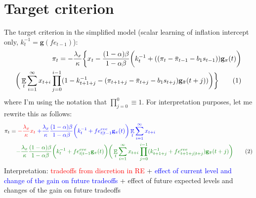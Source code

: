 \documentclass[11pt]{article}
\renewcommand{\[}{\begin{equation}}
\renewcommand{\]}{\end{equation}}
\DeclareMathOperator{\E}{\mathbb{E}}
\newcommand\numberthis{\addtocounter{equation}{1}\tag{\theequation}} %
\begin{document}
\section{Target criterion}\label{target_crit_levels}
The target criterion in the simplified model (scalar learning of inflation intercept only, $k_t^{-1} = \mathbf{g}(fe_{t-1})$):
\begin{align*}
\pi_t  = -\frac{\lambda_x}{\kappa}\bigg\{x_t - \frac{(1-\alpha)\beta}{1-\alpha\beta} \bigg(k_t^{-1}+((\pi_t - \bar{\pi}_{t-1}-b_1 s_{t-1}))\mathbf{g}_{\pi}(t) \bigg) \\
\bigg(\E_t\sum_{i=1}^{\infty}x_{t+i}\prod_{j=0}^{i-1}(1-k_{t+1+j}^{-1} - (\pi_{t+1+j} - \bar{\pi}_{t+j}-b_1 s_{t+j})\mathbf{g_{\bar{\pi}}}(t+j)) \bigg)
\bigg\} \numberthis \label{target}
\end{align*}
where I'm using the notation that $\prod_{j=0}^{0} \equiv 1$. For interpretation purposes, let me rewrite this as follows:
\begin{align*}
\pi_t  = & \; \textcolor{red}{-\frac{\lambda_x}{\kappa} x_t} \textcolor{blue}{ \; + \frac{\lambda_x}{\kappa} \frac{(1-\alpha)\beta}{1-\alpha\beta} \bigg(k_t^{-1}+ fe^{eve}_{t|t-1}\mathbf{g}_{\pi}(t) \bigg)\E_t\sum_{i=1}^{\infty}x_{t+i}}  \\
& \textcolor{mygreen}{- \frac{\lambda_x}{\kappa} \frac{(1-\alpha)\beta}{1-\alpha\beta} \bigg(k_t^{-1}+ fe^{eve}_{t|t-1}\mathbf{g}_{\pi}(t) \bigg) \bigg(\E_t\sum_{i=1}^{\infty}x_{t+i}\prod_{j=0}^{i-1}(k_{t+1+j}^{-1} + fe^{eve}_{t+1+j|t+j})\mathbf{g_{\bar{\pi}}}(t+j) \bigg)}
\numberthis \label{target_interpretation}
\end{align*}
Interpretation: \textcolor{red}{tradeoffs from discretion in RE} + \textcolor{blue}{effect of current level and change of the gain on future tradeoffs} + \textcolor{mygreen}{effect of future expected levels and changes of the gain on future tradeoffs}
\end{document}
